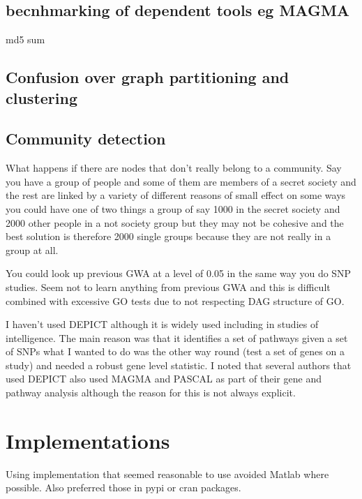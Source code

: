  \subsection{becnhmarking of dependent tools eg MAGMA}
md5 sum

 
 \subsection{Confusion over graph partitioning and clustering}
  \subsection{Community detection}
 What happens if there are nodes that don't really belong to a community. Say you have a group of people and some of them are members of a secret society and the rest are linked by a variety of different reasons of small effect on some ways you could have one of two things a group of say 1000 in the secret society and 2000 other people in a not society group but they may not be cohesive and the best solution is therefore 2000 single groups because they are not really in a group at all. 

 
 
 You could look up previous GWA at a level of 0.05 in the same way you do SNP studies. Seem not to learn anything from previous GWA and this is difficult combined with excessive GO tests due to not respecting DAG structure of GO.
 
 I haven't used DEPICT although it is widely used including in studies of intelligence. The main reason was that it identifies a set of pathways given a set of SNPs what I wanted to do was the other way round (test a set of genes on a study) and needed a robust gene level statistic. I noted that several authors that used DEPICT also used MAGMA and PASCAL as part of their gene and pathway analysis although the reason for this is not always explicit. 
 
 	 
 	 \section{Implementations}

Using implementation that seemed reasonable to use avoided Matlab where possible. Also preferred those in pypi or cran packages. 


